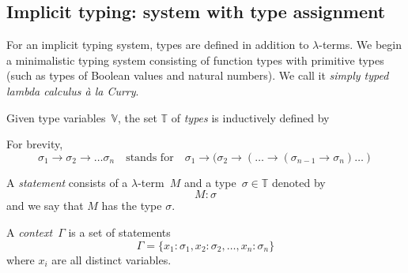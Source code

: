\subsection{Implicit typing: system with type assignment}
For an implicit typing system, types are defined in addition to $\lambda$-terms.
We begin a minimalistic typing system consisting of function types with primitive
types (such as types of Boolean values and natural numbers). We call it
\emph{simply typed lambda calculus \textit{\`a la} Curry}.
\begin{definition}
  Given type variables~$\mathbb{V}$, the set $\mathbb{T}$ of
  \emph{types} is inductively defined by
  \begin{multicols}{2}
    \begin{prooftree}
    \end{prooftree}
    \begin{prooftree}
    \end{prooftree}
  \end{multicols}
\end{definition}
\begin{convention}
  For brevity, 
  \[
    \sigma_1 \to \sigma_2 \to \dots \sigma_n
    \quad\text{stands for}\quad \sigma_1 \to (\sigma_2 \to (
    \dots \to (\sigma_{n-1} \to \sigma_n)\dots)
  \]
\end{convention}
\begin{definition}
    A \emph{statement} consists of a $\lambda$-term~$M$
      and a type~$\sigma \in \mathbb{T}$ denoted by 
      \[
        M : \sigma
      \]
      and we say that $M$ has the type $\sigma$.

    A \emph{context}~$\Gamma$ is a set of statements 
      \[
        \Gamma = \{x_1 : \sigma_1, x_2 : \sigma_2, \ldots, x_n : \sigma_n\}
      \]
      where $x_i$ are all distinct variables. 
\end{definition}
